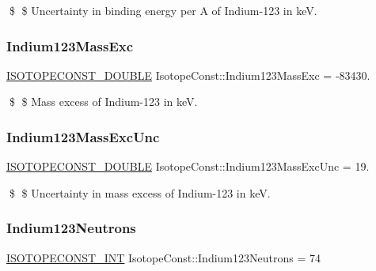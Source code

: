 \$ \$ Uncertainty in binding energy per A of Indium-\/123 in keV. \mbox{\label{group___isotope_const-_indium-_in123_ga36f9e892d8870ff01095fab16a6e69f5}} 
\subsubsection{\texorpdfstring{Indium123\+Mass\+Exc}{Indium123MassExc}}
{\footnotesize\ttfamily \mbox{\hyperlink{group___isotope_const-_macros_ga8f45a7272ce02c0b4c65c44636ed719a}{I\+S\+O\+T\+O\+P\+E\+C\+O\+N\+S\+T\+\_\+\+D\+O\+U\+B\+LE}} Isotope\+Const\+::\+Indium123\+Mass\+Exc = -\/83430.}

\$ \$ Mass excess of Indium-\/123 in keV. \mbox{\label{group___isotope_const-_indium-_in123_ga740eea660380d57a12d1aba3dbf9c4d5}} 
\subsubsection{\texorpdfstring{Indium123\+Mass\+Exc\+Unc}{Indium123MassExcUnc}}
{\footnotesize\ttfamily \mbox{\hyperlink{group___isotope_const-_macros_ga8f45a7272ce02c0b4c65c44636ed719a}{I\+S\+O\+T\+O\+P\+E\+C\+O\+N\+S\+T\+\_\+\+D\+O\+U\+B\+LE}} Isotope\+Const\+::\+Indium123\+Mass\+Exc\+Unc = 19.}

\$ \$ Uncertainty in mass excess of Indium-\/123 in keV. \mbox{\label{group___isotope_const-_indium-_in123_ga8b3fa6d7ee29f6bfb4ec1dc48a83e7a3}} 
\subsubsection{\texorpdfstring{Indium123\+Neutrons}{Indium123Neutrons}}
{\footnotesize\ttfamily \mbox{\hyperlink{group___isotope_const-_macros_ga5f18360b3e99483a35c32d789e62621c}{I\+S\+O\+T\+O\+P\+E\+C\+O\+N\+S\+T\+\_\+\+I\+NT}} Isotope\+Const\+::\+Indium123\+Neutrons = 74}

